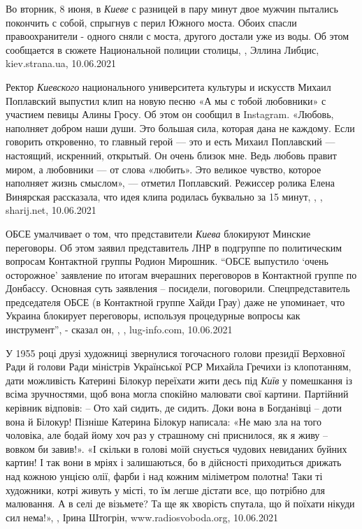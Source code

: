 Во вторник, 8 июня, в \emph{Киеве} с разницей в пару минут двое мужчин пытались
покончить с собой, спрыгнув с перил Южного моста. Обоих спасли правоохранители
- одного сняли с моста, другого достали уже из воды.  Об этом сообщается в
сюжете Национальной полиции столицы,
, Эллина Либцис, kiev.strana.ua, 10.06.2021

Ректор \emph{Киевского} национального университета культуры и искусств Михаил
Поплавский выпустил клип на новую песню «А мы с тобой любовники» с участием
певицы Алины Гросу. Об этом он сообщил в Instagram.  «Любовь, наполняет добром
наши души. Это большая сила, которая дана не каждому. Если говорить откровенно,
то главный герой — это и есть Михаил Поплавский — настоящий, искренний,
открытый. Он очень близок мне. Ведь любовь правит миром, а любовники — от слова
«любить». Это великое чувство, которое наполняет жизнь смыслом», — отметил
Поплавский.  Режиссер ролика Елена Винярская рассказала, что идея клипа
родилась буквально за 15 минут,
, , sharij.net, 10.06.2021

ОБСЕ умалчивает о том, что представители \emph{Киева} блокируют Минские переговоры. Об
этом заявил представитель ЛНР в подгруппе по политическим вопросам Контактной
группы Родион Мирошник.  \enquote{ОБСЕ выпустило \enquote{очень осторожное}
заявление по итогам вчерашних переговоров в Контактной группе по Донбассу.
Основная суть заявления – посидели, поговорили.  Спецпредставитель председателя
ОБСЕ (в Контактной группе Хайди Грау) даже не упоминает, что Украина блокирует
переговоры, используя процедурные вопросы как инструмент}, - сказал он,
, , lug-info.com, 10.06.2021

У 1955 році друзі художниці звернулися тогочасного голови президії Верховної
Ради й голови Ради міністрів Української РСР Михайла Гречихи із клопотанням,
дати можливість Катерині Білокур переїхати жити десь під \emph{Київ} у помешкання із
всіма зручностями, щоб вона могла спокійно малювати свої картини.  Партійний
керівник відповів: – Ото хай сидить, де сидить. Доки вона в Богданівці – доти
вона й Білокур!  Пізніше Катерина Білокур написала: «Не маю зла на того
чоловіка, але бодай йому хоч раз у страшному сні приснилося, як я живу – вовком
би завив!».  «І скільки в голові моїй снується чудових невиданих буйних картин!
І так вони в мріях і залишаються, бо в дійсності приходиться дрижать над кожною
унцією олії, фарби і над кожним міліметром полотна! Таки ті художники, котрі
живуть у місті, то їм легше дістати все, що потрібно для малювання. А в селі де
візьмете? Та ще як хворість спутала, що й поїхати нікуди сил нема!»,
, Ірина Штогрін, www.radiosvoboda.org, 10.06.2021

